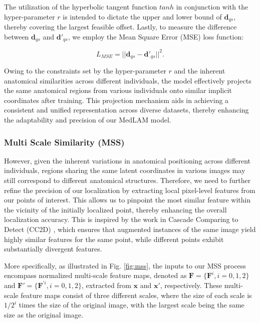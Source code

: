 \documentclass[times,twocolumn,final]{elsarticle}
\begin{document}
The utilization of the hyperbolic tangent function $tanh$ in conjunction with the hyper-parameter $r$ is intended to dictate the upper and lower bound of $\bm{d}_{qs}$, thereby covering the largest feasible offset. Lastly, to measure the difference between $\bm{d}_{qs}$ and $\bm{d}'_{qs}$, we employ the Mean Square Error (MSE) loss function:

\begin{equation}
L_{MSE} = ||\bm{d}_{qs}- \bm{d}'_{qs}||^2 .
\end{equation}

Owing to the constraints set by the hyper-parameter $r$ and the inherent anatomical similarities across different individuals, the model effectively projects the same anatomical regions from various individuals onto similar implicit coordinates after training. This projection mechanism aids in achieving a consistent and unified representation across diverse datasets, thereby enhancing the adaptability and precision of our MedLAM model.


\subsubsection{Multi Scale Similarity (MSS)} 
However, given the inherent variations in anatomical positioning across different individuals, regions sharing the same latent coordinates in various images may still correspond to different anatomical structures. Therefore, we need to further refine the precision of our localization by extracting local pixel-level features from our points of interest. This allows us to pinpoint the most similar feature within the vicinity of the initially localized point, thereby enhancing the overall localization accuracy. This is inspired by the work in Cascade Comparing to Detect (CC2D) \citep{yao2021one}, which ensures that augmented instances of the same image yield highly similar features for the same point, while different points exhibit substantially divergent features.
\par More specifically, as illustrated in Fig. \ref{fig:mss}, the inputs to our MSS process encompass normalized multi-scale feature maps, denoted as $\bm{F}=\{\bm{F}^i,i=0,1,2\}$ and $\bm{F}'=\{\bm{F}^{'i},i=0,1,2\}$, extracted from $\bm{x}$ and $\bm{x}'$, respectively. These multi-scale feature maps consist of three different scales, where the size of each scale is $1/{2^i}$ times the size of the original image, with the largest scale being the same size as the original image.
\end{document}
